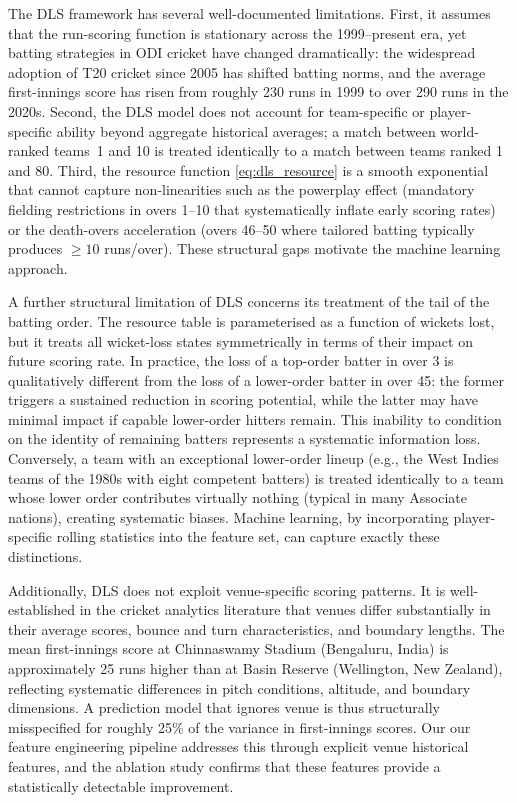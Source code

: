 \documentclass[10pt,a4paper,twocolumn]{article}
\begin{document}
The DLS framework has several well-documented limitations. First, it assumes that the run-scoring function is stationary across the 1999--present era, yet batting strategies in ODI cricket have changed dramatically: the widespread adoption of T20 cricket since 2005 has shifted batting norms, and the average first-innings score has risen from roughly 230 runs in 1999 to over 290 runs in the 2020s. Second, the DLS model does not account for team-specific or player-specific ability beyond aggregate historical averages; a match between world-ranked teams~1 and 10 is treated identically to a match between teams ranked 1 and 80. Third, the resource function \eqref{eq:dls_resource} is a smooth exponential that cannot capture non-linearities such as the powerplay effect (mandatory fielding restrictions in overs 1--10 that systematically inflate early scoring rates) or the death-overs acceleration (overs 46--50 where tailored batting typically produces $\ge 10$ runs/over). These structural gaps motivate the machine learning approach.

A further structural limitation of DLS concerns its treatment of the tail of the batting order. The resource table is parameterised as a function of wickets lost, but it treats all wicket-loss states symmetrically in terms of their impact on future scoring rate. In practice, the loss of a top-order batter in over 3 is qualitatively different from the loss of a lower-order batter in over 45: the former triggers a sustained reduction in scoring potential, while the latter may have minimal impact if capable lower-order hitters remain. This inability to condition on the identity of remaining batters represents a systematic information loss. Conversely, a team with an exceptional lower-order lineup (e.g., the West Indies teams of the 1980s with eight competent batters) is treated identically to a team whose lower order contributes virtually nothing (typical in many Associate nations), creating systematic biases. Machine learning, by incorporating player-specific rolling statistics into the feature set, can capture exactly these distinctions.

Additionally, DLS does not exploit venue-specific scoring patterns. It is well-established in the cricket analytics literature that venues differ substantially in their average scores, bounce and turn characteristics, and boundary lengths. The mean first-innings score at Chinnaswamy Stadium (Bengaluru, India) is approximately 25 runs higher than at Basin Reserve (Wellington, New Zealand), reflecting systematic differences in pitch conditions, altitude, and boundary dimensions. A prediction model that ignores venue is thus structurally misspecified for roughly 25\% of the variance in first-innings scores. Our our feature engineering pipeline addresses this through explicit venue historical features, and the ablation study confirms that these features provide a statistically detectable improvement.
\end{document}
